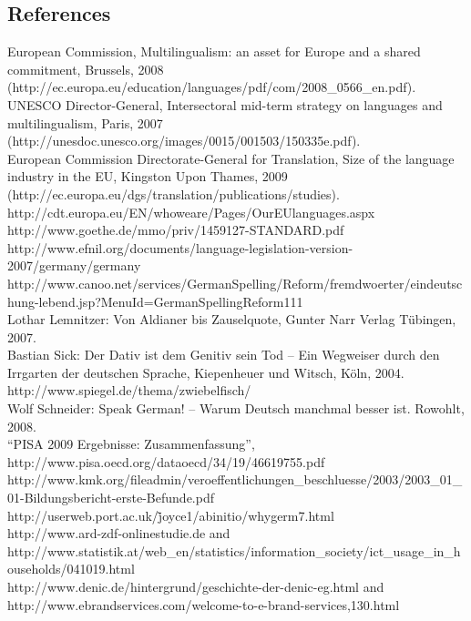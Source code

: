 \documentclass[]{../metanetpaper}
\begin{document}
 \subsection{References}
 European Commission, Multilingualism: an asset for Europe and a shared commitment, Brussels, 2008 (http://ec.europa.eu/education/languages/pdf/com/2008\_0566\_en.pdf).\\
  UNESCO Director-General, Intersectoral mid-term strategy on languages and multilingualism, Paris, 2007 (http://unesdoc.unesco.org/images/0015/001503/150335e.pdf).\\
  European Commission Directorate-General for Translation, Size of the language industry in the EU, Kingston Upon Thames, 2009 (http://ec.europa.eu/dgs/translation/publications/studies).\\
   http://cdt.europa.eu/EN/whoweare/Pages/OurEUlanguages.aspx\\
    http://www.goethe.de/mmo/priv/1459127-STANDARD.pdf\\
 http://www.efnil.org/documents/language-legislation-version-2007/germany/germany\\
  http://www.canoo.net/services/GermanSpelling/Reform/fremdwoerter/eindeutschung-lebend.jsp?MenuId=GermanSpellingReform111\\ Lothar Lemnitzer: Von Aldianer bis Zauselquote, Gunter Narr Verlag Tübingen, 2007.\\
 Bastian Sick: Der Dativ ist dem Genitiv sein Tod – Ein Wegweiser durch den Irrgarten der deutschen Sprache, Kiepenheuer und Witsch, Köln, 2004. \\
 http://www.spiegel.de/thema/zwiebelfisch/\\
 Wolf Schneider: Speak German! – Warum Deutsch manchmal besser ist. Rowohlt, 2008.\\
 “PISA 2009 Ergebnisse: Zusammenfassung”,  http://www.pisa.oecd.org/dataoecd/34/19/46619755.pdf\\
 http://www.kmk.org/fileadmin/veroeffentlichungen\_beschluesse/2003/2003\_01\_01-Bildungsbericht-erste-Befunde.pdf\\
 http://userweb.port.ac.uk/\~joyce1/abinitio/whygerm7.html\\
 http://www.ard-zdf-onlinestudie.de and \\ http://www.statistik.at/web\_en/statistics/information_society/ict\_usage\_in\_households/041019.html\\
 http://www.denic.de/hintergrund/geschichte-der-denic-eg.html and http://www.ebrandservices.com/welcome-to-e-brand-services,130.html\\
\end{document}

